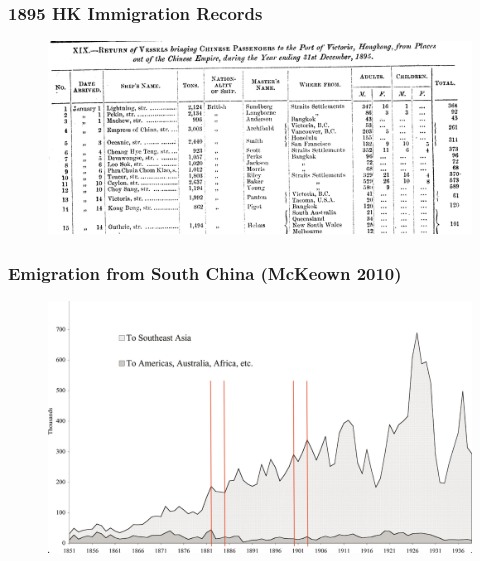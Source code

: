 \documentclass[pdf]{beamer}
\begin{document}
\begin{frame}[label = hk_return]
	\frametitle{1895 HK Immigration Records}
    \centering
	\begin{figure}[H]
		\begin{center}
			\includegraphics[width=\textwidth]{../../figs/6sep23/hk_return_1895.png}
		\end{center}
	\end{figure}
    \hyperlink{departure}{}
\end{frame}

\begin{frame}[label = china_emig_mckeown]
    \frametitle{Emigration from South China (McKeown 2010)}
    \centering
    \begin{figure}
        \includegraphics[width = \textwidth]{../../figs/6sep23/china_emig_mckeown.png}
    \end{figure}
    \hyperlink{chinaflow}{}
\end{frame}
\end{document}
